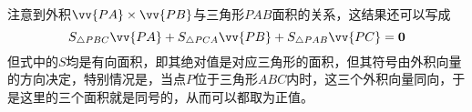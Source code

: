 \begin{example}
  注意到外积$\vv{PA}\times\vv{PB}$与三角形$PAB$面积的关系，这结果还可以写成
  \[ S_{\triangle PBC} \vv{PA} + S_{\triangle PCA} \vv{PB} + S_{\triangle PAB} \vv{PC} = \bm{0} \]
  但式中的$S$均是有向面积，即其绝对值是对应三角形的面积，但其符号由外积向量的方向决定，特别情况是，当点$P$位于三角形$ABC$内时，这三个外积向量同向，于是这里的三个面积就是同号的，从而可以都取为正值。
\end{example}


